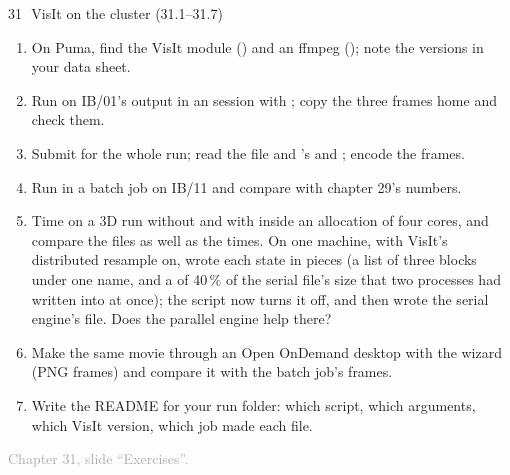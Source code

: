 \documentclass[aspectratio=169,11pt]{beamer}
\newcommand{\sourcecredit}[1]{\vfill\begin{flushright}\tiny\textcolor{DarkGray}{#1}\end{flushright}}
\begin{document}
\begin{frame}{31\,\textbullet\ VisIt on the cluster (31.1--31.7)}
\label{fr:c31x1}
\footnotesize
\begin{enumerate}\setlength{\itemsep}{1pt}
  \item[31.1] On Puma, find the VisIt module () and an ffmpeg (); note the versions in your data sheet.
  \item[31.2] Run  on IB/01's output in an  session with ; copy the three frames home and check them.
  \item[31.3] Submit  for the whole run; read the  file and 's  and ; encode the frames.
  \item[31.4] Run  in a batch job on IB/11 and compare  with chapter 29's numbers.
  \item[31.5] Time  on a 3D run without  and with  inside an allocation of four cores, and compare the files as well as the times. On one machine, with VisIt's distributed resample on,  wrote each state in pieces (a  list of three blocks under one name, and a  of 40\,\% of the serial file's size that two processes had written into at once); the script now turns it off, and  then wrote the serial engine's file. Does the parallel engine help there?
  \item[31.6] Make the same movie through an Open OnDemand desktop with the wizard (PNG frames) and compare it with the batch job's frames.
  \item[31.7] Write the README for your run folder: which script, which arguments, which VisIt version, which job made each file.
\end{enumerate}
\sourcecredit{Chapter 31, slide ``Exercises''.}
\end{frame}
\end{document}
